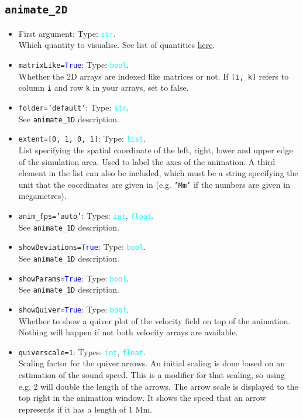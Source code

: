 \documentclass{article}
\newcommand{\ttt}[1]{\texttt{#1}}
\newcommand{\ptype}[1]{\texttt{\textcolor{cyan}{#1}}}
\newcommand{\cbl}[1]{\textcolor{blue}{#1}}
\newcommand{\cro}[1]{\textcolor{RedOrange}{#1}}
\newcommand{\cyo}[1]{\textcolor{YellowOrange}{#1}}
\begin{document}
\subsection{\ttt{animate\_2D}}
\label{sec:anim2}
\begin{itemize}
	\item First argument: Type: \ptype{str}.\\Which quantity to visualise. See list of quantities \hyperref[sec:quants]{here}.
	\item \ttt{\cro{matrixLike}=\cbl{True}}: Type: \ptype{bool}.\\Whether the 2D arrays are indexed like matrices or not. If \ttt{[i, k]} refers to column \ttt{i} and row \ttt{k} in your arrays, set to false.
	\item \ttt{\cro{folder}=\cyo{'default'}}: Type: \ptype{str}.\\See \ttt{animate\_1D} description.
	\item \ttt{\cro{extent}=[0, 1, 0, 1]}: Type: \ptype{list}.\\List specifying the spatial coordinate of the left, right, lower and upper edge of the simulation area. Used to label the axes of the animation. A third element in the list can also be included, which must be a string specifying the unit that the coordinates are given in (e.g. \ttt{'Mm'} if the numbers are given in megametres).
	\item \ttt{\cro{anim\_fps}=\cyo{'auto'}}: Types: \ptype{int}, \ptype{float}.\\See \ttt{animate\_1D} description.
	\item \ttt{\cro{showDeviations}=\cbl{True}}: Type: \ptype{bool}.\\See \ttt{animate\_1D} description.
	\item \ttt{\cro{showParams}=\cbl{True}}: Type: \ptype{bool}.\\See \ttt{animate\_1D} description.
	\item \ttt{\cro{showQuiver}=\cbl{True}}: Type: \ptype{bool}.\\Whether to show a quiver plot of the velocity field on top of the animation. Nothing will happen if not both velocity arrays are available.
	\item \ttt{\cro{quiverscale}=1}: Types: \ptype{int}, \ptype{float}.\\Scaling factor for the quiver arrows. An initial scaling is done based on an estimation of the sound speed. This is a modifier for that scaling, so using e.g. 2 will double the length of the arrows. The arrow scale is displayed to the top right in the animation window. It shows the speed that an arrow represents if it has a length of 1 Mm.

\end{itemize}
\end{document}

